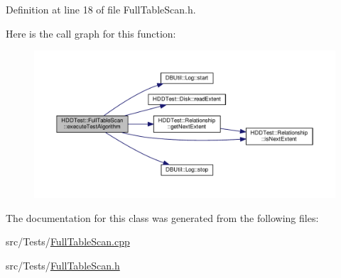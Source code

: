 Definition at line 18 of file Full\-Table\-Scan.\-h.



Here is the call graph for this function\-:\nopagebreak
\begin{figure}[H]
\begin{center}
\leavevmode
\includegraphics[width=350pt]{class_h_d_d_test_1_1_full_table_scan_a732473e7440538517ab2c1f6e9e636eb_cgraph}
\end{center}
\end{figure}




The documentation for this class was generated from the following files\-:\begin{DoxyCompactItemize}
\item 
src/\-Tests/\hyperlink{_full_table_scan_8cpp}{Full\-Table\-Scan.\-cpp}\item 
src/\-Tests/\hyperlink{_full_table_scan_8h}{Full\-Table\-Scan.\-h}\end{DoxyCompactItemize}
